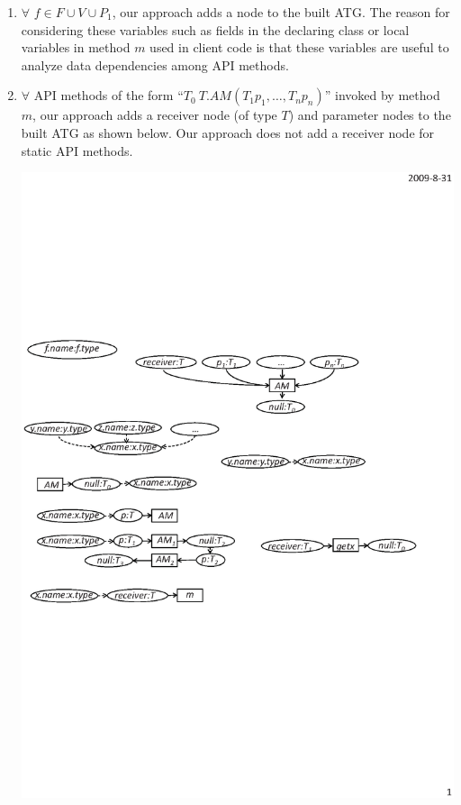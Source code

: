 \begin{enumerate}\vspace*{-2ex}
\item $\forall$ $f \in F \cup V \cup P_1$, our approach adds a node to the built ATG.
The reason for considering these variables such as fields in
the declaring class or local variables in method $m$ used in client code
is that these variables are useful to analyze data dependencies
among API methods.\vspace*{-2ex}
\item $\forall$ API methods of the form ``$T_0\ T.AM (T_1 p_1, \ldots, T_n p_n)$''
invoked by method $m$, our approach adds a receiver node (of type $T$) and
parameter nodes to the built ATG as shown below. Our approach does
not add a receiver node for static API methods. \vspace*{-2ex}

\begin{center}
\includegraphics[scale=0.7,clip]{figure/rule2.eps}%
\end{center}\vspace*{-3ex}


\end{enumerate}
